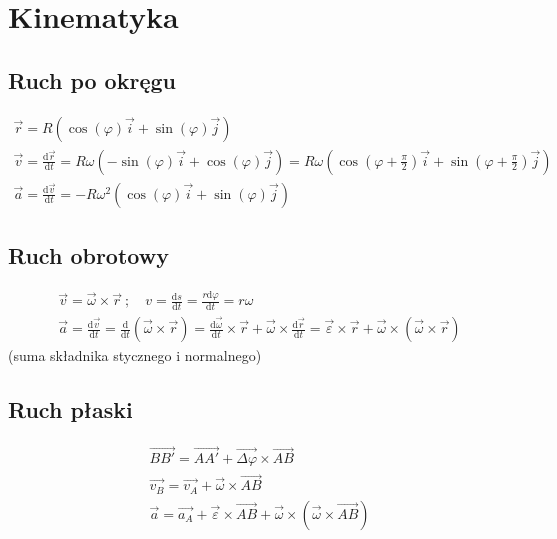 \documentclass[12pt,a4paper]{article}
\begin{document}
\section*{Kinematyka}

\subsection*{Ruch po okręgu}
\begin{gather*}
   \vec{r} = R \left( \cos(\varphi)\vec{i} + \sin(\varphi)\vec{j} \right) \\
   \vec{v} = \frac{\mathrm{d}\vec{r}}{\mathrm{d}t} = R\omega \left( -\sin(\varphi)\vec{i}+\cos(\varphi)\vec{j} \right) = R\omega \left( \cos\left( \varphi+\frac{\pi}{2} \right)\vec{i}+\sin\left( \varphi+\frac{\pi}{2} \right)\vec{j} \right)\\
   \vec{a} = \frac{\mathrm{d}\vec{v}}{\mathrm{d}t} = -R\omega^2 \left( \cos(\varphi)\vec{i} + \sin(\varphi)\vec{j} \right)
\end{gather*}

\subsection*{Ruch obrotowy}
\begin{gather*}
   \vec{v} = \vec{\omega}\times\vec{r}\ ; \quad v = \frac{\mathrm{d}s}{\mathrm{d}t} = \frac{r\mathrm{d}\varphi}{\mathrm{d}t} = r\omega\\
   \vec{a} = \frac{\mathrm{d}\vec{v}}{\mathrm{d}t} = \frac{\mathrm{d}}{\mathrm{d}t} \left( \vec{\omega} \times \vec{r} \right) = \frac{\mathrm{d}\vec{\omega}}{\mathrm{d}t} \times \vec{r} + \vec{\omega} \times \frac{\mathrm{d}\vec{r}}{\mathrm{d}t} = \vec{\varepsilon} \times \vec{r}+\vec{\omega}\times\left( \vec{\omega}\times \vec{r} \right)
\end{gather*}
\qquad (suma składnika stycznego i normalnego)

\subsection*{Ruch płaski}
\begin{gather*}
   \vec{BB'} = \vec{AA'} + \vec{\Delta \varphi}\times\vec{AB}\\
   \vec{v_B} = \vec{v_A}+\vec{\omega}\times\vec{AB}\\
   \vec{a} = \vec{a_A} + \vec{\varepsilon} \times \vec{AB}+\vec{\omega}\times\left( \vec{\omega}\times \vec{AB} \right)
\end{gather*}
\end{document}
